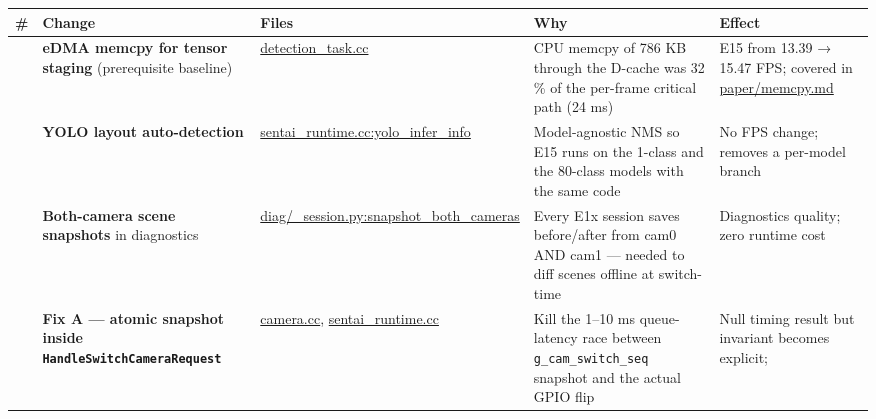 {\def\LTcaptype{none} %
\begin{longtable}[]{@{}
  >{\raggedright\arraybackslash}p{}
  >{\raggedright\arraybackslash}p{}
  >{\raggedright\arraybackslash}p{}
  >{\raggedright\arraybackslash}p{}
  >{\raggedright\arraybackslash}p{}@{}}
\toprule\noalign{}
\begin{minipage}[b]{\linewidth}\raggedright
\#
\end{minipage} & \begin{minipage}[b]{\linewidth}\raggedright
Change
\end{minipage} & \begin{minipage}[b]{\linewidth}\raggedright
Files
\end{minipage} & \begin{minipage}[b]{\linewidth}\raggedright
Why
\end{minipage} & \begin{minipage}[b]{\linewidth}\raggedright
Effect
\end{minipage} \\
\midrule\noalign{}
\endhead
\bottomrule\noalign{}
\endlastfoot
1 & \textbf{eDMA memcpy for tensor staging} (prerequisite baseline) &
\href{../detection_task.cc}{detection\_task.cc} & CPU memcpy of 786 KB
through the D-cache was 32 \% of the per-frame critical path (24 ms) &
E15 from 13.39 → 15.47 FPS; covered in
\href{memcpy.md}{paper/memcpy.md} \\
2 & \textbf{YOLO layout auto-detection} &
\href{../sentai_runtime.cc}{sentai\_runtime.cc:yolo\_infer\_info} &
Model-agnostic NMS so E15 runs on the 1-class and the 80-class models
with the same code & No FPS change; removes a per-model branch \\
3 & \textbf{Both-camera scene snapshots} in diagnostics &
\href{../diag/_session.py}{diag/\_session.py:snapshot\_both\_cameras} &
Every E1x session saves before/after from cam0 AND cam1 --- needed to
diff scenes offline at switch-time & Diagnostics quality; zero runtime
cost \\
4 & \textbf{Fix A --- atomic snapshot inside
\texttt{HandleSwitchCameraRequest}} &
\href{../../../libs/camera/camera.cc}{camera.cc},
\href{../sentai_runtime.cc}{sentai\_runtime.cc} & Kill the 1--10 ms
queue-latency race between \texttt{g\_cam\_switch\_seq} snapshot and the
actual GPIO flip & Null timing result but invariant becomes explicit;

\end{longtable}}
